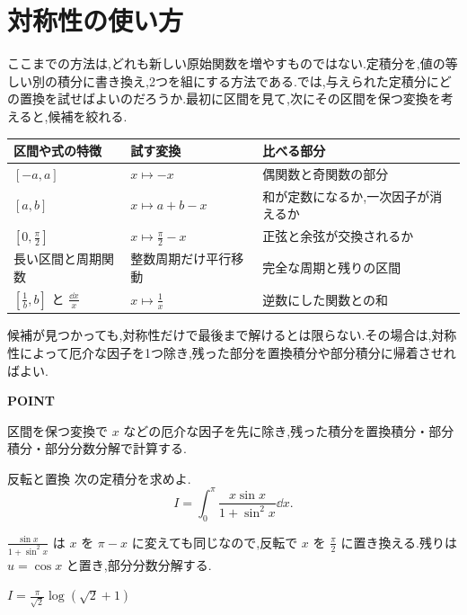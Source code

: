 \section{対称性の使い方}\label{節:定積分の手法選択}

ここまでの方法は,どれも新しい原始関数を増やすものではない.定積分を,値の等しい別の積分に書き換え,2つを組にする方法である.では,与えられた定積分にどの置換を試せばよいのだろうか.最初に区間を見て,次にその区間を保つ変換を考えると,候補を絞れる.

\begin{center}
\begin{tabularx}{0.96\linewidth}{@{}lXX@{}}
\toprule
区間や式の特徴 & 試す変換 & 比べる部分\\
\midrule
$[-a,a]$ & $x\mapsto -x$ & 偶関数と奇関数の部分\\
$[a,b]$ & $x\mapsto a+b-x$ & 和が定数になるか,一次因子が消えるか\\
$\left[0,\frac{\pi}{2}\right]$ & $x\mapsto\frac{\pi}{2}-x$ & 正弦と余弦が交換されるか\\
長い区間と周期関数 & 整数周期だけ平行移動 & 完全な周期と残りの区間\\
$\left[\frac1b,b\right]$ と $\frac{\dd x}{x}$ & $x\mapsto\frac1x$ & 逆数にした関数との和\\
\bottomrule
\end{tabularx}
\end{center}

候補が見つかっても,対称性だけで最後まで解けるとは限らない.その場合は,対称性によって厄介な因子を1つ除き,残った部分を置換積分や部分積分に帰着させればよい.

\begin{bookpoint}
\textbf{POINT}\par
区間を保つ変換で $x$ などの厄介な因子を先に除き,残った積分を置換積分・部分積分・部分分数分解で計算する.
\end{bookpoint}

\begin{example}{反転と置換}
次の定積分を求めよ.
\[
I=\int_0^\pi\frac{x\sin x}{1+\sin^2x}\dd x.
\]
\end{example}

$\frac{\sin x}{1+\sin^2x}$ は $x$ を $\pi-x$ に変えても同じなので,反転で $x$ を $\frac{\pi}{2}$ に置き換える.残りは $u=\cos x$ と置き,部分分数分解する.

$I=\frac{\pi}{\sqrt2}\log(\sqrt2+1)$

